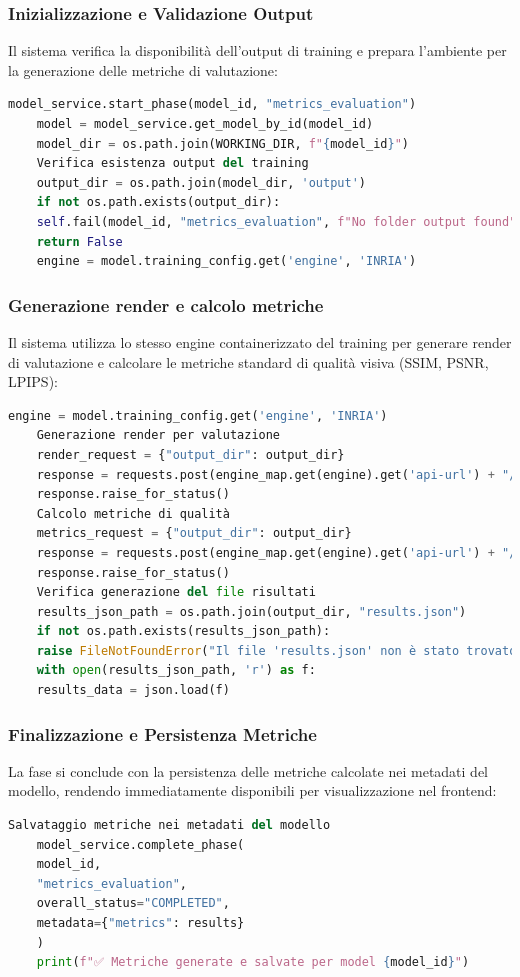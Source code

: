 \subsubsection{Inizializzazione e Validazione Output}
Il sistema verifica la disponibilità dell'output di training e prepara l'ambiente per la generazione delle metriche di valutazione:
\begin{lstlisting}[language=python, caption=Inizializzazione e validazione output training]
	model_service.start_phase(model_id, "metrics_evaluation")
	model = model_service.get_model_by_id(model_id)
	model_dir = os.path.join(WORKING_DIR, f"{model_id}")
	Verifica esistenza output del training
	output_dir = os.path.join(model_dir, 'output')
	if not os.path.exists(output_dir):
	self.fail(model_id, "metrics_evaluation", f"No folder output found")
	return False
	engine = model.training_config.get('engine', 'INRIA')
\end{lstlisting}
\subsubsection{Generazione render e calcolo metriche}
Il sistema utilizza lo stesso engine containerizzato del training per generare render di valutazione e calcolare le metriche standard di qualità visiva (SSIM, PSNR, LPIPS):
\begin{lstlisting}[language=python, caption=Generazione render e calcolo metriche]
	engine = model.training_config.get('engine', 'INRIA')
	Generazione render per valutazione
	render_request = {"output_dir": output_dir}
	response = requests.post(engine_map.get(engine).get('api-url') + "/render", json=render_request)
	response.raise_for_status()
	Calcolo metriche di qualità
	metrics_request = {"output_dir": output_dir}
	response = requests.post(engine_map.get(engine).get('api-url') + "/metrics", json=metrics_request)
	response.raise_for_status()
	Verifica generazione del file risultati
	results_json_path = os.path.join(output_dir, "results.json")
	if not os.path.exists(results_json_path):
	raise FileNotFoundError("Il file 'results.json' non è stato trovato.")
	with open(results_json_path, 'r') as f:
	results_data = json.load(f)
\end{lstlisting}
\newpage
\subsubsection{Finalizzazione e Persistenza Metriche}
La fase si conclude con la persistenza delle metriche calcolate nei metadati del modello, rendendo immediatamente disponibili per visualizzazione nel frontend:
\begin{lstlisting}[language=python, caption=Persistenza metriche e completamento workflow]
	Salvataggio metriche nei metadati del modello
	model_service.complete_phase(
	model_id,
	"metrics_evaluation",
	overall_status="COMPLETED",
	metadata={"metrics": results}
	)
	print(f"✅ Metriche generate e salvate per model {model_id}")
\end{lstlisting}

